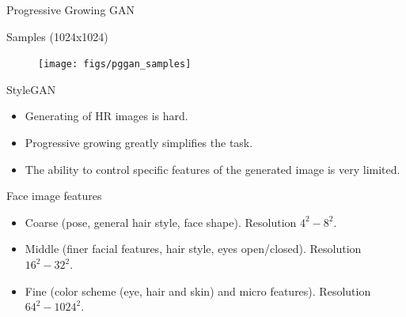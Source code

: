 \begin{frame}{Progressive Growing GAN}
	\begin{block}{Samples (1024x1024)}
		\begin{figure}
			\centering
			\texttt{[image: figs/pggan\_samples]}
		\end{figure}
	\end{block}

\end{frame}
\begin{frame}{StyleGAN}
	\begin{itemize}
		\item Generating of HR images is hard.
		\item Progressive growing greatly simplifies the task.
		\item The ability to control specific features of the generated image is very limited.
	\end{itemize}
	\begin{block}{Face image features}
		\begin{itemize}
			\item Coarse (pose, general hair style, face shape). Resolution $4^2 - 8^2$.
			\item Middle (finer facial features, hair style, eyes open/closed). Resolution $16^2 - 32^2$.
			\item Fine (color scheme (eye, hair and skin) and micro features). Resolution $64^2 - 1024^2$.
		\end{itemize}
	\end{block}
\end{frame}
